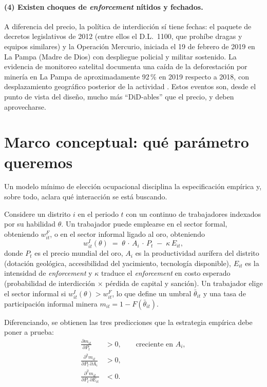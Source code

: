 \documentclass[11pt,a4paper]{article}
\begin{document}
\paragraph{(4) Existen choques de \emph{enforcement} nítidos y fechados.} A diferencia del precio, la política de interdicción sí tiene fechas: el paquete de decretos legislativos de 2012 (entre ellos el D.L.~1100, que prohíbe dragas y equipos similares) y la Operación Mercurio, iniciada el 19 de febrero de 2019 en La Pampa (Madre de Dios) con despliegue policial y militar sostenido. La evidencia de monitoreo satelital documenta una caída de la deforestación por minería en La Pampa de aproximadamente 92\,\% en 2019 respecto a 2018, con desplazamiento geográfico posterior de la actividad \citep{maap2019}. Estos eventos son, desde el punto de vista del diseño, mucho más ``DiD-ables'' que el precio, y deben aprovecharse.

\section{Marco conceptual: qué parámetro queremos}\label{sec:modelo}

Un modelo mínimo de elección ocupacional disciplina la especificación empírica y, sobre todo, aclara qué interacción se está buscando.

Considere un distrito $i$ en el periodo $t$ con un continuo de trabajadores indexados por su habilidad $\theta$. Un trabajador puede emplearse en el sector formal, obteniendo $w^F_{it}$, o en el sector informal ligado al oro, obteniendo
\begin{equation}
w^{I}_{it}(\theta) \;=\; \theta \, \cdot \, A_i \, \cdot \, P_t \;-\; \kappa \, E_{it},
\label{eq:wI}
\end{equation}
donde $P_t$ es el precio mundial del oro, $A_i$ es la productividad aurífera del distrito (dotación geológica, accesibilidad del yacimiento, tecnología disponible), $E_{it}$ es la intensidad de \emph{enforcement} y $\kappa$ traduce el \emph{enforcement} en costo esperado (probabilidad de interdicción $\times$ pérdida de capital y sanción). Un trabajador elige el sector informal si $w^I_{it}(\theta) > w^F_{it}$, lo que define un umbral $\bar\theta_{it}$ y una tasa de participación informal minera $m_{it} = 1 - F(\bar\theta_{it})$.

Diferenciando, se obtienen las tres predicciones que la estrategia empírica debe poner a prueba:
\begin{align}
\frac{\partial m_{it}}{\partial P_t} &> 0, \qquad\text{creciente en } A_i,
\label{eq:pred1}\\[2pt]
\frac{\partial^2 m_{it}}{\partial P_t \, \partial A_i} &> 0,
\label{eq:pred2}\\[2pt]
\frac{\partial^2 m_{it}}{\partial P_t \, \partial E_{it}} &< 0.
\label{eq:pred3}
\end{align}
\end{document}
